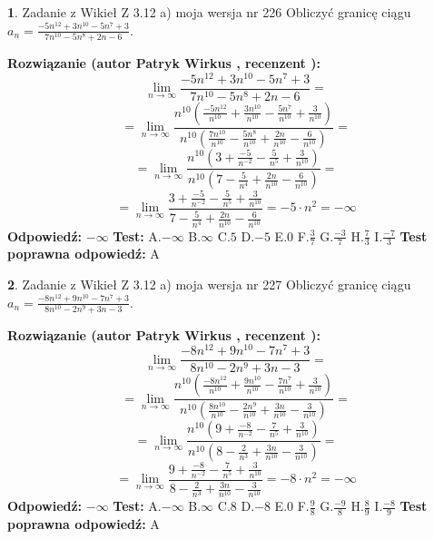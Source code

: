 \documentclass[12pt, a4paper]{article}
\theoremstyle{definition} %
\newtheorem{zad}{}
\newcommand{\zadStart}[1]{\begin{zad}#1\newline}
\newcommand{\zadStop}{\end{zad}}
\newcommand{\rozwStart}[2]{\noindent \textbf{Rozwiązanie (autor #1 , recenzent #2): }\newline}
\newcommand{\rozwStop}{\newline}
\newcommand{\odpStart}{\noindent \textbf{Odpowiedź:}\newline}
\newcommand{\odpStop}{\newline}
\newcommand{\testStart}{\noindent \textbf{Test:}\newline}
\newcommand{\testStop}{\newline}
\newcommand{\kluczStart}{\noindent \textbf{Test poprawna odpowiedź:}\newline}
\newcommand{\kluczStop}{\newline}
\begin{document}
\zadStart{Zadanie z Wikieł Z 3.12 a) moja wersja nr 226}
Obliczyć granicę ciągu $a_{n}=\frac{-5n^{12}+3n^{10}-5n^{7}+3}{7n^{10}-5n^{8}+2n-6}$.
\zadStop
\rozwStart{Patryk Wirkus}{}
$$\lim\limits_{n\to\infty}\frac{-5n^{12}+3n^{10}-5n^{7}+3}{7n^{10}-5n^{8}+2n-6}=$$
$$=\lim\limits_{n\to\infty}\frac{n^{10}\left(\frac{-5n^{12}}{n^{10}}+\frac{3n^{10}}{n^{10}}-\frac{5n^{7}}{n^{10}}+\frac{3}{n^{10}}\right)}{n^{10}\left(\frac{7n^{10}}{n^{10}}-\frac{5n^{8}}{n^{10}}+\frac{2n}{n^{10}}-\frac{6}{n^{10}}\right)}=$$
$$=\lim\limits_{n\to\infty}\frac{n^{10}\left(3+\frac{-5}{n^{-2}}-\frac{5}{n^{5}}+\frac{3}{n^{10}}\right)}
{n^{10}\left(7-\frac{5}{n^{4}}+\frac{2n}{n^{10}}-\frac{6}{n^{10}}\right)}=$$
$$=\lim\limits_{n\to\infty}\frac{3+\frac{-5}{n^{-2}}-\frac{5}{n^{5}}+\frac{3}{n^{10}}}{7-\frac{5}{n^{4}}+\frac{2n}{n^{10}}-\frac{6}{n^{10}}}=-5\cdot n^{2} = -\infty$$
\rozwStop
\odpStart
$-\infty$
\odpStop
\testStart
A.$-\infty$
B.$\infty$
C.$5$
D.$-5$
E.$0$
F.$\frac{3}{7}$
G.$\frac{-3}{7}$
H.$\frac{7}{3}$
I.$\frac{-7}{3}$
\testStop
\kluczStart
A
\kluczStop



\zadStart{Zadanie z Wikieł Z 3.12 a) moja wersja nr 227}
Obliczyć granicę ciągu $a_{n}=\frac{-8n^{12}+9n^{10}-7n^{7}+3}{8n^{10}-2n^{9}+3n-3}$.
\zadStop
\rozwStart{Patryk Wirkus}{}
$$\lim\limits_{n\to\infty}\frac{-8n^{12}+9n^{10}-7n^{7}+3}{8n^{10}-2n^{9}+3n-3}=$$
$$=\lim\limits_{n\to\infty}\frac{n^{10}\left(\frac{-8n^{12}}{n^{10}}+\frac{9n^{10}}{n^{10}}-\frac{7n^{7}}{n^{10}}+\frac{3}{n^{10}}\right)}{n^{10}\left(\frac{8n^{10}}{n^{10}}-\frac{2n^{9}}{n^{10}}+\frac{3n}{n^{10}}-\frac{3}{n^{10}}\right)}=$$
$$=\lim\limits_{n\to\infty}\frac{n^{10}\left(9+\frac{-8}{n^{-2}}-\frac{7}{n^{5}}+\frac{3}{n^{10}}\right)}
{n^{10}\left(8-\frac{2}{n^{3}}+\frac{3n}{n^{10}}-\frac{3}{n^{10}}\right)}=$$
$$=\lim\limits_{n\to\infty}\frac{9+\frac{-8}{n^{-2}}-\frac{7}{n^{5}}+\frac{3}{n^{10}}}{8-\frac{2}{n^{3}}+\frac{3n}{n^{10}}-\frac{3}{n^{10}}}=-8\cdot n^{2} = -\infty$$
\rozwStop
\odpStart
$-\infty$
\odpStop
\testStart
A.$-\infty$
B.$\infty$
C.$8$
D.$-8$
E.$0$
F.$\frac{9}{8}$
G.$\frac{-9}{8}$
H.$\frac{8}{9}$
I.$\frac{-8}{9}$
\testStop
\kluczStart
A
\kluczStop
\end{document}

